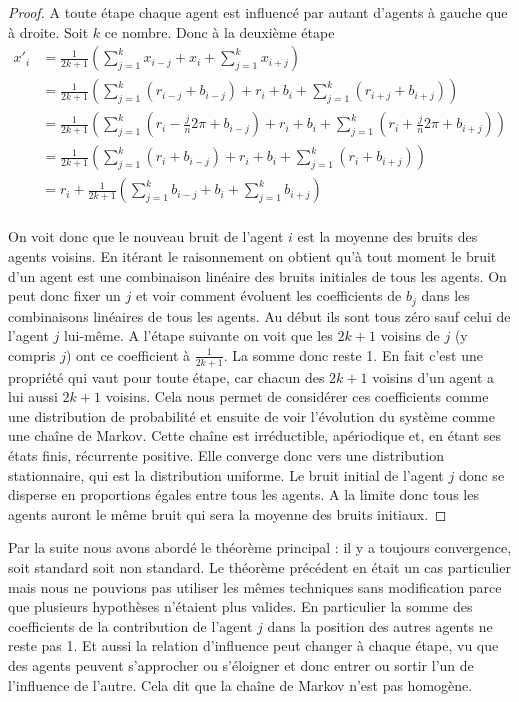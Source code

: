 \documentclass[a4paper,10pt]{article}
\begin{document}
\begin{proof}
A toute étape chaque agent est influencé par autant d'agents à gauche que à droite. Soit $k$ ce nombre. Donc à la deuxième étape
\begin{equation*}
\begin{split}
x'_i &= \frac{1}{2k+1} \left( \sum_{j=1}^k x_{i-j} + x_i + \sum_{j=1}^k x_{i+j} \right) \\
     &= \frac{1}{2k+1} \left( \sum_{j=1}^k (r_{i-j} + b_{i-j}) + r_i + b_i + \sum_{j=1}^k (r_{i+j} + b_{i+j}) \right) \\
     &= \frac{1}{2k+1} \left( \sum_{j=1}^k (r_i - \frac{j}{n}2 \pi + b_{i-j}) + r_i + b_i + \sum_{j=1}^k (r_i + \frac{j}{n}2 \pi + b_{i+j}) \right) \\
     &= \frac{1}{2k+1} \left( \sum_{j=1}^k (r_i + b_{i-j}) + r_i + b_i + \sum_{j=1}^k (r_i + b_{i+j}) \right) \\
     &= r_i + \frac{1}{2k+1} \left( \sum_{j=1}^k b_{i-j} + b_i + \sum_{j=1}^k b_{i+j} \right) \\
\end{split}
\end{equation*}

On voit donc que le nouveau bruit de l'agent $i$ est la moyenne des bruits des agents voisins. En itérant le raisonnement on obtient qu'à tout moment le bruit d'un agent est une combinaison linéaire des bruits initiales de tous les agents. On peut donc fixer un $j$ et voir comment évoluent les coefficients de $b_j$ dans les combinaisons linéaires de tous les agents. Au début ils sont tous zéro sauf celui de l'agent $j$ lui-même. A l’étape suivante on voit que les $2k+1$ voisins de $j$ (y compris $j$) ont ce coefficient à $\frac{1}{2k+1}$. La somme donc reste 1. En fait c'est une propriété qui vaut pour toute étape, car chacun des $2k+1$ voisins d'un agent a lui aussi $2k+1$ voisins. Cela nous permet de considérer ces coefficients comme une distribution de probabilité et ensuite de voir l’évolution du système comme une chaîne de Markov. Cette chaîne est irréductible, apériodique et, en étant ses états finis, récurrente positive. Elle converge donc vers une distribution stationnaire, qui est la distribution uniforme. Le bruit initial de l'agent $j$ donc se disperse en proportions égales entre tous les agents. A la limite donc tous les agents auront le même bruit qui sera la moyenne des bruits initiaux.
\end{proof}

Par la suite nous avons abordé le théorème principal : il y a toujours convergence, soit standard soit non standard. Le théorème précédent en était un cas particulier mais nous ne pouvions pas utiliser les mêmes techniques sans modification parce que plusieurs hypothèses n’étaient plus valides. En particulier la somme des coefficients de la contribution de l'agent $j$ dans la position des autres agents ne reste pas 1. Et aussi la relation d'influence peut changer à chaque étape, vu que des agents peuvent s'approcher ou s’éloigner et donc entrer ou sortir l'un de l'influence de l'autre. Cela dit que la chaîne de Markov n'est pas homogène.
\end{document}
